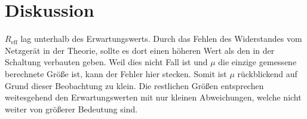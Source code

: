 \section{Diskussion}
\label{sec:Diskussion}
$R_{\text{eff}}$ lag unterhalb des Erwartungswerts. 
Durch das Fehlen des Widerstandes vom Netzgerät in der Theorie, sollte es dort einen höheren Wert als den in der Schaltung verbauten geben.
Weil dies nicht Fall ist und $\mu$ die einzige gemessene berechnete Größe ist, kann der Fehler hier stecken.
Somit ist $\mu$ rückblickend auf Grund dieser Beobachtung zu klein.
Die restlichen Größen entsprechen weitesgehend den Erwartungswerten mit nur kleinen Abweichungen, welche nicht weiter von größerer Bedeutung sind.
